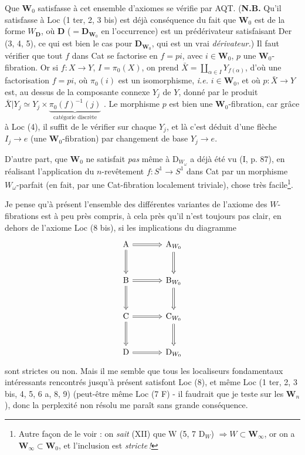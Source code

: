 \documentclass[11pt]{article}
\newcommand{\printedpage}[1]{\marginpar{\footnotesize p.~#1}}
\newcommand{\msp}[1]{\marginpar{\footnotesize [#1]}}
\begin{document}
\printedpage{39}

\msp{page 69}
Que $\mathbf{W}_0$ satisfasse à cet ensemble d'axiomes se vérifie par AQT. (\textbf{N.B.} Qu'il satisfasse à Loc (1 ter, 2, 3 bis) est déjà conséquence du fait que $\mathbf{W}_0$ est de la forme $W_{\mathbf{D}}$, où $\mathbf{D}$ ($=\mathbf{D}_{\mathbf{W}_0}$ en l'occurrence) est un prédérivateur satisfaisant Der (3, 4, 5), ce qui est bien le cas pour $\mathbf{D}_{\mathbf{W}_0}$, qui est un vrai \textit{dérivateur.}) Il faut vérifier que tout $f$ dans Cat se factorise en $f = pi$, avec $i \in \mathbf{W}_0$, $p$ une $\mathbf{W}_0$-fibration. Or si $f : X \longrightarrow Y$, $I = \pi_0(X)$, on prend $\bar{X} = \coprod_{\alpha\in I} Y_{f(\alpha)}$, d'où une factorisation $f = pi$, où $\pi_0(i)$ est un isomorphisme, \textit{i.e.} $i \in \mathbf{W}_0$, et où $p : \bar{X} \longrightarrow Y$ est, au dessus de la composante connexe $Y_j$ de $Y$, donné par le produit $\bar{X}|Y_j \simeq Y_j \times \underbrace{\pi_0(f)^{-1}(j)}_{\text{catégorie discrète}}$ . Le morphisme $p$ est bien une $\mathbf{W}_0$-fibration, car grâce à Loc (4), il suffit de le vérifier sur chaque $Y_j$, et là c'est déduit d'une flèche $I_j \longrightarrow e$ (une $\mathbf{W}_0$-fibration) par changement de base $Y_j \longrightarrow e$.

D'autre part, que $\mathbf{W}_0$ ne satisfait \textit{pas} même à $\mathrm{D}_{W_\omega}$ a déjà été vu (I, p. 87),
\msp{page 70}
en réalisant l'application du $n$-revêtement $f : S^1 \longrightarrow S^1$ dans Cat par un morphisme $W_\omega$-parfait (en fait, par une Cat-fibration localement triviale), chose très facile\footnote[37]{Autre façon de le voir : on \textit{sait} (XII) que $\mathrm{W}$ (5, 7 $\mathrm{D}_W$) $\Longrightarrow W \subset \mathbf{W}_\infty$, or on a $\mathbf{W}_\infty \subset \mathbf{W}_0$, et l'inclusion est \textit{stricte\,!}}.

Je pense qu'à présent l'ensemble des différentes variantes de l'axiome des $W$-fibrations est à peu près compris, à cela près qu'il n'est toujours pas clair, en dehors de l'axiome Loc (8 bis), si les implications du diagramme
\[
\begin{tikzcd}[row sep=large, column sep=large]
\mathrm{A} \arrow[r, Rightarrow] \arrow[d, Rightarrow] & \mathrm{A}_{W_0} \arrow[d, Rightarrow] \\
\mathrm{B} \arrow[r, Rightarrow] \arrow[d, Rightarrow] & \mathrm{B}_{W_0} \arrow[d, Rightarrow] \\
\mathrm{C} \arrow[r, Rightarrow] \arrow[d, Rightarrow] & \mathrm{C}_{W_0} \arrow[d, Rightarrow] \\
\mathrm{D} \arrow[r, Rightarrow] & \mathrm{D}_{W_0}
\end{tikzcd}
\]
sont strictes ou non. Mais il me semble que tous les localiseurs fondamentaux intéressants rencontrés jusqu'à présent satisfont Loc (8), et même Loc (1 ter, 2, 3 bis, 4, 5, 6 a, 8, 9) (peut-être même Loc (7 F) - il faudrait que je teste sur les $\mathbf{W}_n$), donc la perplexité non résolu me paraît sans grande conséquence. %
\end{document}
